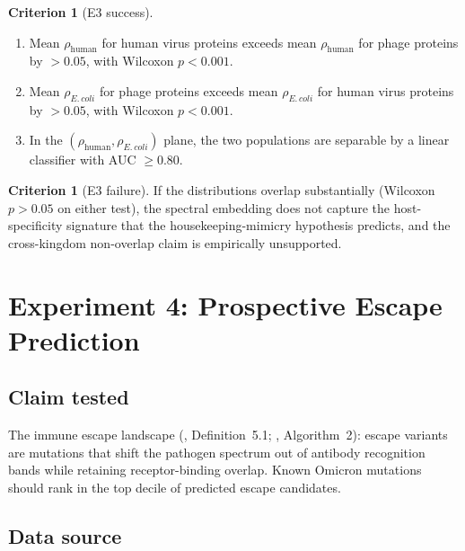 \documentclass[11pt,a4paper]{article}
\theoremstyle{expthm}
\theoremstyle{definition}
\newtheorem{criterion}[theorem]{Criterion}
\theoremstyle{remark}
\begin{document}
\begin{criterion}[E3 success]
\label{crit:e3-success}
\leavevmode
\begin{enumerate}[label=(\alph*),leftmargin=1.8em,itemsep=2pt]
\item Mean $\rho_{\mathrm{human}}$ for human virus proteins exceeds mean
  $\rho_{\mathrm{human}}$ for phage proteins by $> 0.05$, with Wilcoxon
  $p < 0.001$.
\item Mean $\rho_{E.\,coli}$ for phage proteins exceeds mean
  $\rho_{E.\,coli}$ for human virus proteins by $> 0.05$, with Wilcoxon
  $p < 0.001$.
\item In the $(\rho_{\mathrm{human}}, \rho_{E.\,coli})$ plane, the two
  populations are separable by a linear classifier with AUC $\geq 0.80$.
\end{enumerate}
\end{criterion}

\begin{criterion}[E3 failure]
If the distributions overlap substantially (Wilcoxon $p > 0.05$ on either
test), the spectral embedding does not capture the host-specificity
signature that the housekeeping-mimicry hypothesis predicts, and the
cross-kingdom non-overlap claim is empirically unsupported.
\end{criterion}

\section{Experiment 4: Prospective Escape Prediction}
\label{sec:exp4}

\subsection{Claim tested}

The immune escape landscape
(\citep{sachikonye2026immuno}, Definition~5.1;
\citep{sachikonye2026pathogen}, Algorithm~2): escape variants are
mutations that shift the pathogen spectrum out of antibody recognition
bands while retaining receptor-binding overlap. Known Omicron mutations
should rank in the top decile of predicted escape candidates.

\subsection{Data source}
\end{document}
